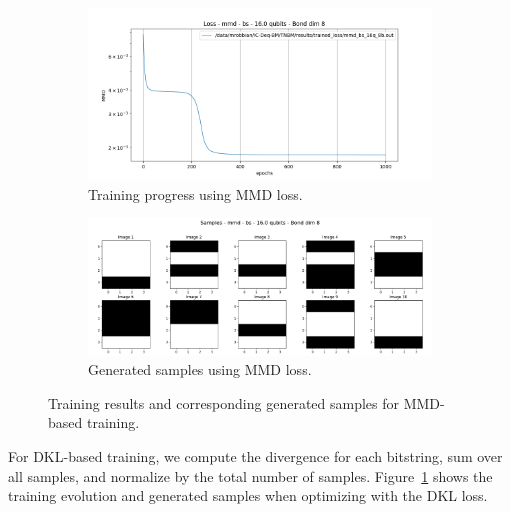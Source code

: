 \begin{figure}[h]
    \centering
    \begin{subfigure}[b]{\textwidth}  
        \centering
        \includegraphics[width=\textwidth]{images/loss_plot/loss_mmd_bs_16.0q_8b_2000i.png}
        \caption{Training progress using MMD loss.}
    \end{subfigure}
    \hfill
    \begin{subfigure}[b]{\textwidth}  
        \centering
        \includegraphics[width=\textwidth]{images/sample_plot/samples_mmd_bs_16.0q_8b_2000i.png}
        \caption{Generated samples using MMD loss.}
    \end{subfigure}
    \caption{Training results and corresponding generated samples for MMD-based training.}
    \label{fig:training_mmd}
\end{figure}

For DKL-based training, we compute the divergence for each bitstring, sum over all samples, and normalize by the total number of samples. Figure~\ref{fig:training_mmd} shows the training evolution and generated samples when optimizing with the DKL loss.

